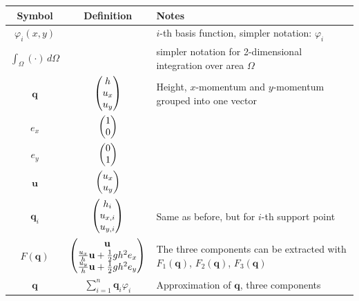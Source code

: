 \documentclass{article}
\renewcommand{\phi}{\varphi}
\begin{document}
\newenvironment{meine}{}{}
\newcommand{\mypmatrix}[1]
{
  \begin{meine}
    \renewcommand{\arraystretch}{1}
    \begin{pmatrix}
      #1
    \end{pmatrix}
    \renewcommand{\arraystretch}{2}
  \end{meine}
}

\begin{center}
  \begin{longtable}[h!]{ccp{8cm}}
    \toprule
    Symbol & Definition & Notes \\
    \midrule{}

    $\phi_i(x,y)$ & & $i$-th basis function, simpler notation: $\phi_i$ \\

    $\int_\Omega (\cdot)\, d\Omega$ & & simpler notation for 2-dimensional integration over area $\Omega$ \\

    $\mathbf{q}$ & $\mypmatrix{
      h \\ u_x \\ u_y
    }$ & Height, $x$-momentum and $y$-momentum grouped into one vector \\

    $e_x$ & $\mypmatrix{ 1 \\ 0 }$ & \\
    $e_y$ & $\mypmatrix{ 0 \\ 1 }$ & \\

    $\mathbf{u}$ & $ \mypmatrix{ u_x \\ u_y }$ & \\

    $\mathbf{q}_i$ & $\mypmatrix{
      h_i \\ u_{x,i} \\ u_{y,i}
    }$ & Same as before, but for $i$-th support point  \\

    $F(\mathbf{q})$ & 
    $\mypmatrix{ \mathbf{u} \\ \frac{u_x}{h}\mathbf{u} + \frac{1}{2} g h^2 e_x \\ \frac{u_y}{h}\mathbf{u} + \frac{1}{2} g h^2 e_y }$ & 
    The three components can be extracted with $F_1(\mathbf{q})$, $F_2(\mathbf{q})$, $F_3(\mathbf{q})$ \\
   
    $\mathbf{q}$ & $\sum_{i=1}^n \mathbf{q}_i \phi_i$ & Approximation of $\mathbf{q}$, three components \\


\end{longtable}
\end{center}
\end{document}
